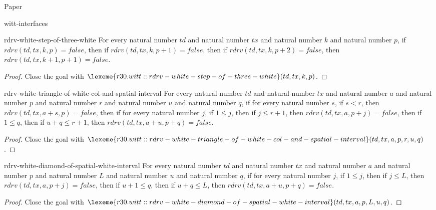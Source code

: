 \begin{lexlean}{Paper}
\begin{section}{witt-interfaces}
  \begin{theorem}{rdrv-white-step-of-three-white}
  For every natural number \(td\) and natural number \(tx\) and natural number \(k\) and natural number \(p\), if \(rdrv(td, tx, k, p) = false\), then if \(rdrv(td, tx, k, p + 1) = false\), then if \(rdrv(td, tx, k, p + 2) = false\), then \(rdrv(td, tx, k + 1, p + 1) = false\).
  \begin{proof}
  Close the goal with \(\lexeme{r30.witt::rdrv-white-step-of-three-white}(td, tx, k, p)\).
  \end{proof}
  \end{theorem}

  \begin{theorem}{rdrv-white-triangle-of-white-col-and-spatial-interval}
  For every natural number \(td\) and natural number \(tx\) and natural number \(a\) and natural number \(p\) and natural number \(r\) and natural number \(u\) and natural number \(q\), if for every natural number \(s\), if \(s < r\), then \(rdrv(td, tx, a + s, p) = false\), then if for every natural number \(j\), if \(1 ≤ j\), then if \(j ≤ r + 1\), then \(rdrv(td, tx, a, p + j) = false\), then if \(1 ≤ q\), then if \(u + q ≤ r + 1\), then \(rdrv(td, tx, a + u, p + q) = false\).
  \begin{proof}
  Close the goal with \(\lexeme{r30.witt::rdrv-white-triangle-of-white-col-and-spatial-interval}(td, tx, a, p, r, u, q)\).
  \end{proof}
  \end{theorem}

  \begin{theorem}{rdrv-white-diamond-of-spatial-white-interval}
  For every natural number \(td\) and natural number \(tx\) and natural number \(a\) and natural number \(p\) and natural number \(L\) and natural number \(u\) and natural number \(q\), if for every natural number \(j\), if \(1 ≤ j\), then if \(j ≤ L\), then \(rdrv(td, tx, a, p + j) = false\), then if \(u + 1 ≤ q\), then if \(u + q ≤ L\), then \(rdrv(td, tx, a + u, p + q) = false\).
  \begin{proof}
  Close the goal with \(\lexeme{r30.witt::rdrv-white-diamond-of-spatial-white-interval}(td, tx, a, p, L, u, q)\).
  \end{proof}
  \end{theorem}


\end{section}
\end{lexlean}
